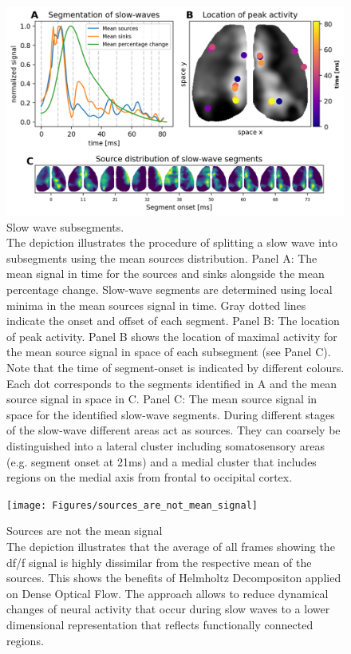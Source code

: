 \begin{figure}[!htb]
\centering
\includegraphics[width=\textwidth,height=\textheight,keepaspectratio]{Figures/slow_wave_subsegements}
\decoRule
\caption[Slow wave subsegments]{Slow wave subsegments.\\The depiction illustrates the procedure of splitting a slow wave into subsegments using the mean sources distribution. Panel A: The mean signal in time for the sources and sinks alongside the mean percentage change. Slow-wave segments are determined using local minima in the mean sources signal in time. Gray dotted lines indicate the onset and offset of each segment. Panel B: The location of peak activity. Panel B shows the location of maximal activity for the mean source signal in space of each subsegment (see Panel C). Note that the time of segment-onset is indicated by different colours. Each dot corresponds to the segments identified in A and the mean source signal in space in C. Panel C: The mean source signal in space for the identified slow-wave segments. During different stages of the slow-wave different areas act as sources. They can coarsely be distinguished into a lateral cluster including somatosensory areas (e.g. segment onset at 21ms) and a medial cluster that includes regions on the medial axis from frontal to occipital cortex.}
\label{fig:slow_wave_subsegements}
\end{figure}

\begin{figure}[!htb]
\centering
\texttt{[image: Figures/sources\_are\_not\_mean\_signal]}
\decoRule
\caption[Sources are not the mean signal]{Sources are not the mean signal\\ The depiction illustrates that the average of all frames showing the df/f signal is highly dissimilar from the respective mean of the sources. This shows the benefits of Helmholtz Decompositon applied on Dense Optical Flow. The approach allows to reduce dynamical changes of neural activity that occur during slow waves to a lower dimensional representation that reflects functionally connected regions.}
\label{fig:sources_are_not_mean_signal}
\end{figure}



